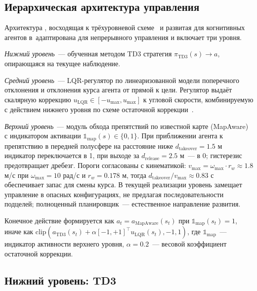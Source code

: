 \documentclass[11pt]{article}
\begin{document}
\subsection{Иерархическая архитектура управления}
\label{sec:architecture}



Архитектура , восходящая к трёхуровневой схеме~\cite{gat1998three} и развитая для когнитивных агентов в~\cite{kiselev2020dissertation,kiselev2020}адаптирована для непрерывного управления и включает три уровня.

\textit{Нижний уровень}~--- обученная методом TD3 стратегия $\pi_{\mathrm{TD3}}(s) \to a$, опирающаяся на текущее наблюдение.

\textit{Средний уровень}~--- LQR-регулятор по линеаризованной модели поперечного отклонения и отклонения курса агента от прямой к цели. Регулятор выдаёт скалярную коррекцию $u_{\mathrm{LQR}} \in [-u_{\max}, u_{\max}]$ к угловой скорости, комбинируемую с действием нижнего уровня по схеме остаточной коррекции~\cite{silver2018residual,johannink2019residual}.

\textit{Верхний уровень}~--- модуль обхода препятствий по известной карте (MapAware) с индикатором активации $\mathbb{1}_{\mathrm{map}}(s) \in \{0, 1\}$. При приближении агента к препятствию в передней полусфере на расстояние ниже $d_{\mathrm{takeover}} = 1.5$ м индикатор переключается в 1, при выходе за $d_{\mathrm{release}} = 2.5$ м~--- в 0; гистерезис предотвращает дребезг. Пороги согласованы с кинематикой: $v_{\max} = \omega_{\max} \cdot r_w \approx 1.8$ м/с при $\omega_{\max} = 10$ рад/с и $r_w = 0.178$ м, тогда $d_{\mathrm{takeover}} / v_{\max} \approx 0.83$ с обеспечивает запас для смены курса. В текущей реализации уровень замещает управление в опасных конфигурациях, не предлагая последовательности подцелей; полноценный планировщик~--- естественное направление развития.

Конечное действие формируется как $a_t = a_{\mathrm{MapAware}}(s_t)$ при $\mathbb{1}_{\mathrm{map}}(s_t) = 1$, иначе как $\mathrm{clip}(a_{\mathrm{TD3}}(s_t) + \alpha [-1,+1]^\top u_{\mathrm{LQR}}(s_t), -1, 1)$, где $\mathbb{1}_{\mathrm{map}}$~--- индикатор активности верхнего уровня, $\alpha = 0.2$~--- весовой коэффициент остаточной коррекции.


\subsection{Нижний уровень: TD3}
\label{sec:reactive}
\end{document}
